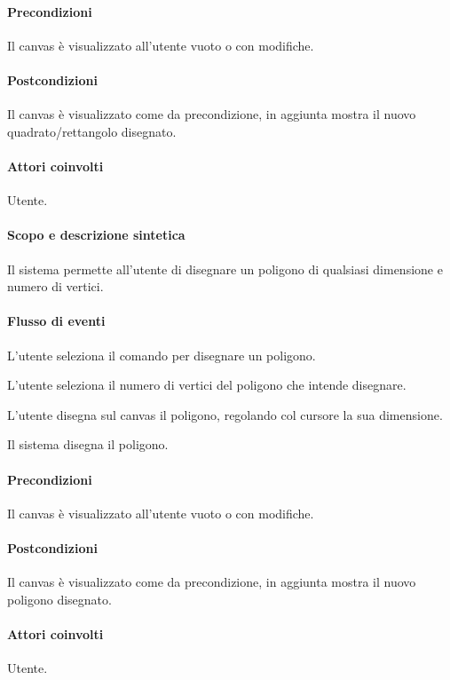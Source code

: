 \paragraph{Precondizioni} Il canvas \`e visualizzato all'utente vuoto o con modifiche.
\paragraph{Postcondizioni} Il canvas \`e visualizzato come da precondizione, in aggiunta mostra il nuovo quadrato/rettangolo disegnato.

\paragraph{Attori coinvolti} Utente.
\paragraph{Scopo e descrizione sintetica} 
Il sistema permette all'utente di disegnare un poligono di qualsiasi dimensione e numero di vertici.
\paragraph{Flusso di eventi}
\begin{elenconumerato}[\textbf{}]{\subsubsecindent}
\item L'utente seleziona il comando per disegnare un poligono.
\item L'utente seleziona il numero di vertici del poligono che intende disegnare.
\item L'utente disegna sul canvas il poligono, regolando col cursore la sua dimensione.
\item Il sistema disegna il poligono.
\end{elenconumerato}
\paragraph{Precondizioni} Il canvas \`e visualizzato all'utente vuoto o con modifiche.
\paragraph{Postcondizioni} Il canvas \`e visualizzato come da precondizione, in aggiunta mostra il nuovo poligono disegnato.

\paragraph{Attori coinvolti} Utente.
